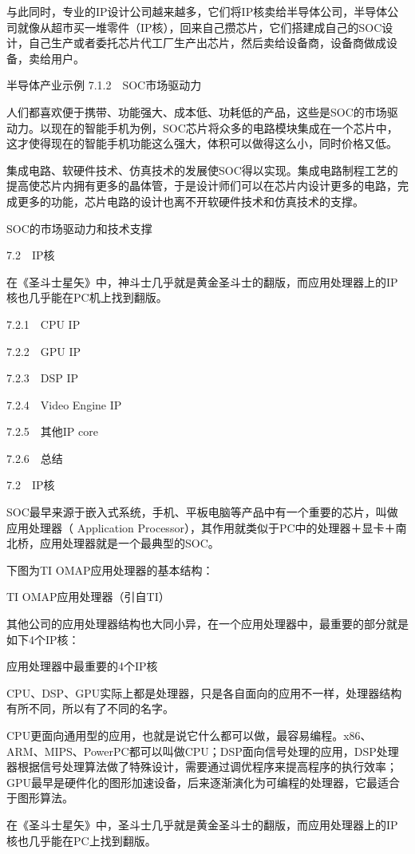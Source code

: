 \documentclass[12pt,UTF8]{ctexbook}
\begin{document}
与此同时，专业的IP设计公司越来越多，它们将IP核卖给半导体公司，半导体公司就像从超市买一堆零件（IP核），回来自己攒芯片，它们搭建成自己的SOC设计，自己生产或者委托芯片代工厂生产出芯片，然后卖给设备商，设备商做成设备，卖给用户。

半导体产业示例
7.1.2　SOC市场驱动力

人们都喜欢便于携带、功能强大、成本低、功耗低的产品，这些是SOC的市场驱动力。以现在的智能手机为例，SOC芯片将众多的电路模块集成在一个芯片中，这才使得现在的智能手机功能这么强大，体积可以做得这么小，同时价格又低。

集成电路、软硬件技术、仿真技术的发展使SOC得以实现。集成电路制程工艺的提高使芯片内拥有更多的晶体管，于是设计师们可以在芯片内设计更多的电路，完成更多的功能，芯片电路的设计也离不开软硬件技术和仿真技术的支撑。

SOC的市场驱动力和技术支撑


7.2　IP核

在《圣斗士星矢》中，神斗士几乎就是黄金圣斗士的翻版，而应用处理器上的IP核也几乎能在PC机上找到翻版。

7.2.1　CPU IP

7.2.2　GPU IP

7.2.3　DSP IP

7.2.4　Video Engine IP

7.2.5　其他IP core

7.2.6　总结


7.2　IP核

SOC最早来源于嵌入式系统，手机、平板电脑等产品中有一个重要的芯片，叫做应用处理器（ Application Processor），其作用就类似于PC中的处理器＋显卡＋南北桥，应用处理器就是一个最典型的SOC。

下图为TI OMAP应用处理器的基本结构：

TI OMAP应用处理器（引自TI）

其他公司的应用处理器结构也大同小异，在一个应用处理器中，最重要的部分就是如下4个IP核：

应用处理器中最重要的4个IP核

CPU、DSP、GPU实际上都是处理器，只是各自面向的应用不一样，处理器结构有所不同，所以有了不同的名字。

CPU更面向通用型的应用，也就是说它什么都可以做，最容易编程。x86、ARM、MIPS、PowerPC都可以叫做CPU；DSP面向信号处理的应用，DSP处理器根据信号处理算法做了特殊设计，需要通过调优程序来提高程序的执行效率；GPU最早是硬件化的图形加速设备，后来逐渐演化为可编程的处理器，它最适合于图形算法。

在《圣斗士星矢》中，圣斗士几乎就是黄金圣斗士的翻版，而应用处理器上的IP核也几乎能在PC上找到翻版。
\end{document}
